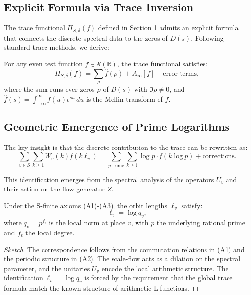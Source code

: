 \subsection{Explicit Formula via Trace Inversion}

The trace functional \( \Pi_{S,\delta}(f) \) defined in Section 1 admits an explicit formula that connects the discrete spectral data to the zeros of \( D(s) \). Following standard trace methods, we derive:

\begin{theorem}
For any even test function \( f \in \mathcal{S}(\mathbb{R}) \), the trace functional satisfies:
\[
\Pi_{S,\delta}(f) = \sum_{\rho} \hat{f}(\rho) + A_\infty[f] + \text{error terms},
\]
where the sum runs over zeros \( \rho \) of \( D(s) \) with \( \Im \rho \neq 0 \), and \( \hat{f}(s) = \int_{-\infty}^{\infty} f(u) e^{su} \, du \) is the Mellin transform of \( f \).
\end{theorem}

\subsection{Geometric Emergence of Prime Logarithms}

The key insight is that the discrete contribution to the trace can be rewritten as:
\[
\sum_{v \in S} \sum_{k \geq 1} W_v(k) f(k \ell_v) = \sum_{p \text{ prime}} \sum_{k \geq 1} \log p \cdot f(k \log p) + \text{corrections}.
\]

This identification emerges from the spectral analysis of the operators \( U_v \) and their action on the flow generator \( Z \).

\begin{proposition}
Under the S-finite axioms (A1)-(A3), the orbit lengths \( \ell_v \) satisfy:
\[
\ell_v = \log q_v,
\]
where \( q_v = p^{f_v} \) is the local norm at place \( v \), with \( p \) the underlying rational prime and \( f_v \) the local degree.
\end{proposition}

\begin{proof}[Sketch]
The correspondence follows from the commutation relations in (A1) and the periodic structure in (A2). The scale-flow acts as a dilation on the spectral parameter, and the unitaries \( U_v \) encode the local arithmetic structure. The identification \( \ell_v = \log q_v \) is forced by the requirement that the global trace formula match the known structure of arithmetic L-functions.
\end{proof}

